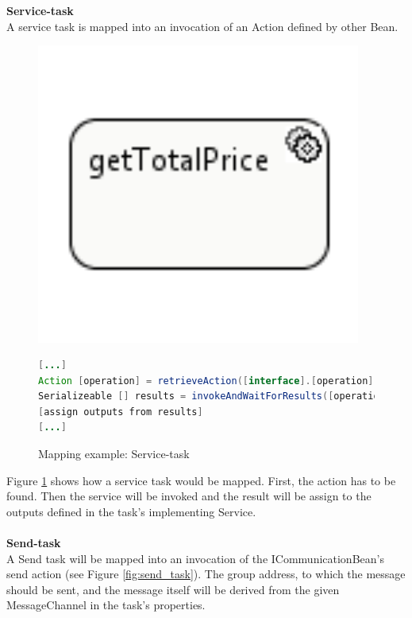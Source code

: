 \textbf{Service-task}\\
A service task is mapped into an invocation of an Action defined by other Bean.\\

\begin{figure}[h]
\begin{minipage}[c]{0.3\textwidth}
\includegraphics[width=0.95\textwidth]{images/mapping/service_task.png}
\end{minipage}
\begin{minipage}[c]{0.7\textwidth}
\begin{lstlisting}[language=Java]
[...]
Action [operation] = retrieveAction([interface].[operation]);
Serializeable [] results = invokeAndWaitForResults([operation], new Serializeable[]{[inputs]}).getResults();
[assign outputs from results]
[...]
\end{lstlisting}
\end{minipage}
\caption{Mapping example: Service-task}%
\label{fig:service_task}%
\end{figure}
Figure \ref{fig:service_task} shows how a service task would be mapped. First, the action has to be found. Then the service will be invoked and the result will be assign to the outputs defined in the task's implementing Service.\\\\

\textbf{Send-task}\\
A Send task will be mapped into an invocation of the ICommunicationBean's send action (see Figure \ref{fig:send_task}). The group address, to which the message should be sent, and the message itself will be derived from the given MessageChannel in the task's properties. \\\\
 
